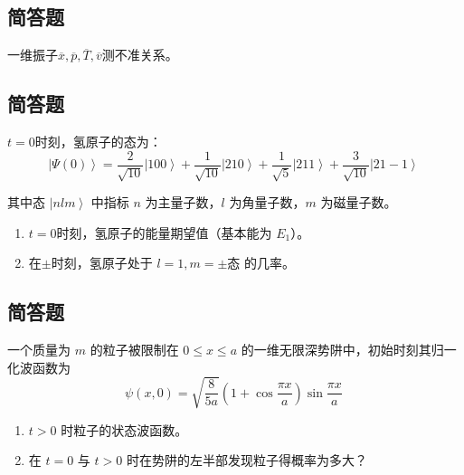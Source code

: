\subsection{简答题}
一维振子$\overline{x},\overline{p},\overline{T},\overline{v}$测不准关系。
\subsection{简答题}
$t=0$时刻，氢原子的态为：
\[
\left| \Psi(0) \right\rangle = \frac{2}{\sqrt{10}} \left| 100 \right\rangle + \frac{1}{\sqrt{10}} \left| 210 \right\rangle + \frac{1}{\sqrt{5}} \left| 211 \right\rangle + \frac{3}{\sqrt{10}} \left| 21-1 \right\rangle~
\]

其中态 $\left| nlm\right\rangle$ 中指标 $n$ 为主量子数，$l$ 为角量子数，$m$ 为磁量子数。

\begin{enumerate}
    \item $t=0$时刻，氢原子的能量期望值（基本能为 $E_1$）。
    \item 在$\pm$时刻，氢原子处于 $l=1, m=\pm$态 的几率。
\end{enumerate}
\subsection{简答题}
一个质量为 $m$ 的粒子被限制在 $0 \leq x \leq a$ 的一维无限深势阱中，初始时刻其归一化波函数为 
\[
\psi(x,0) = \sqrt{\frac{8}{5a}} \left( 1 + \cos \frac{\pi x}{a} \right) \sin \frac{\pi x}{a}~
\]

\begin{enumerate}
    \item  $t > 0$ 时粒子的状态波函数。
    \item  在 $t = 0$ 与 $t > 0$ 时在势阱的左半部发现粒子得概率为多大？
\end{enumerate}